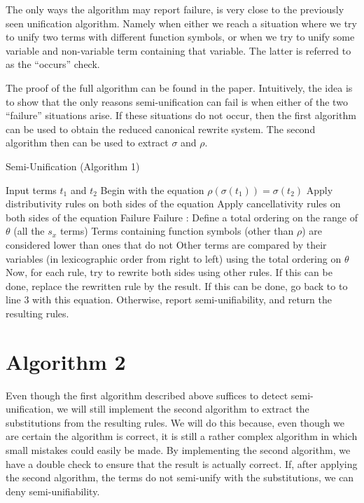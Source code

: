 The only ways the algorithm may report failure, is very close to the previously seen unification algorithm. Namely when either we reach a situation where we try to unify two terms with different function symbols, or when we try to unify some variable and non-variable term containing that variable. The latter is referred to as the ``occurs'' check. 

The proof of the full algorithm can be found in the paper\cite{SemiUnification}. Intuitively, the idea is to show that the only reasons semi-unification can fail is when either of the two ``failure'' situations arise. If these situations do not occur, then the first algorithm can be used to obtain the reduced canonical rewrite system. The second algorithm then can be used to extract $\sigma$ and $\rho$.  

\begin{algorithm}
\caption{Semi-Unification (Algorithm 1)}
\label{semiunification1}
\begin{algorithmic}[1]
\STATE Input terms $t_1$ and $t_2$
\STATE Begin with the equation $\rho(\sigma(t_1)) = \sigma(t_2)$
\STATE Apply distributivity rules on both sides of the equation
\STATE Apply cancellativity rules on both sides of the equation
    \RETURN Failure
    \RETURN Failure
  \ENDIF
\ENDFOR
\STATE {}:
\STATE Define a total ordering on the range of $\theta$ (all the $s_x$ terms)
\STATE Terms containing function symbols (other than $\rho$) are considered lower than ones that do not
\STATE Other terms are compared by their variables (in lexicographic order from right to left) using the total ordering on $\theta$ 
\STATE Now, for each rule, try to rewrite both sides using other rules. If this can be done, replace the rewritten rule by the result.
\STATE If this can be done, go back to to line 3 with this equation. 
\STATE Otherwise, report semi-unifiability, and return the resulting rules. 
\end{algorithmic}
\end{algorithm}

\section{Algorithm 2} 
Even though the first algorithm described above suffices to detect semi-unification, we will still implement the second algorithm to extract the substitutions from the resulting rules. We will do this because, even though we are certain the algorithm is correct, it is still a rather complex algorithm in which small mistakes could easily be made. By implementing the second algorithm, we have a double check to ensure that the result is actually correct. If, after applying the second algorithm, the terms do not semi-unify with the substitutions, we can deny semi-unifiability.
